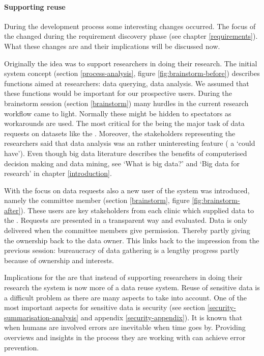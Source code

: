 \paragraph{Supporting reuse}

During the development process some interesting changes occurred.
The focus of the \ivfsystem{} changed during the requirement discovery phase (see chapter \ref{requirements}).
What these changes are and their implications will be discussed now.

Originally the idea was to support researchers in doing their research.
The initial system concept (section \ref{process-analysis}, figure \ref{fig:brainstorm-before}) describes functions aimed at researchers: data querying, data analysis.
We assumed that these functions would be important for our prospective users.
During the brainstorm session (section \ref{brainstorm}) many hurdles in the current research workflow came to light.
Normally these might be hidden to spectators as workarounds are used.
The most critical for the \ivfsystem{} being the major task of data requests on datasets like the \projectdata{}.
Moreover, the stakeholders representing the researchers said that data analysis was an rather uninteresting feature (\ie{} a `could have').
Even though big data literature describes the benefits of computerised decision making and data mining, see `What is big data?' and `Big data for \project{} research' in chapter \ref{introduction}.

With the focus on data requests also a new user of the system was introduced, namely the committee member (section \ref{brainstorm}, figure \ref{fig:brainstorm-after}).
These users are key stakeholders from each clinic which supplied data to the \projectdata{}.
Requests are presented in a transparent way and evaluated.
Data is only delivered when the committee members give permission. 
Thereby partly giving the ownership back to the data owner.
This links back to the impression from the previous session: bureaucracy of data gathering is a lengthy progress partly because of ownership and interests.

Implications for the \ivfsystem{} are that instead of supporting researchers in doing their research the system is now more of a data reuse system.
Reuse of sensitive data is a difficult problem as there are many aspects to take into account.
One of the most important aspects for sensitive data is security (see section \ref{security-summarisation-analysis} and appendix \ref{security-appendix}).
It is known that when humans are involved errors are inevitable when time goes by.
Providing overviews and insights in the process they are working with can achieve error prevention.

